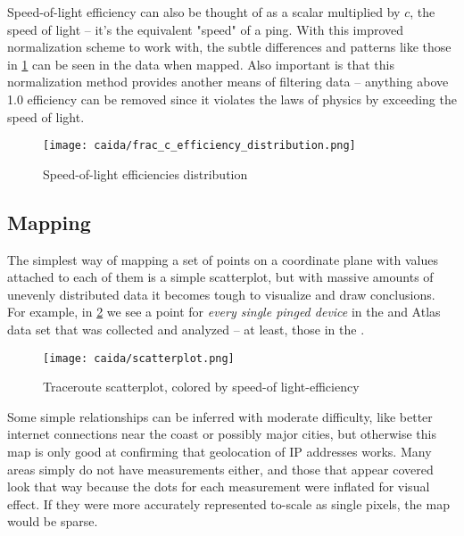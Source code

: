 Speed-of-light efficiency can also be thought of as a scalar multiplied by $c$, the speed of light -- it's the equivalent "speed" of a ping. With this improved normalization scheme to work with, the subtle differences and patterns like those in \cref{fig:speed_of_light_efficiency_distribution} can be seen in the data when mapped. Also important is that this normalization method provides another means of filtering data -- anything above 1.0 efficiency can be removed since it violates the laws of physics by exceeding the speed of light.

\begin{figure}[ht]
    \centering
    \texttt{[image: caida/frac\_c\_efficiency\_distribution.png]}
    \caption{Speed-of-light efficiencies distribution}
    \label{fig:speed_of_light_efficiency_distribution}
\end{figure}

\subsection{Mapping}

The simplest way of mapping a set of points on a coordinate plane with values attached to each of them is a simple scatterplot, but with massive amounts of unevenly distributed data it becomes tough to visualize and draw conclusions. For example, in \cref{fig:caida_scatterplot} we see a point for \textit{every single pinged device} in the \caida and \ripe Atlas data set that was collected and analyzed -- at least, those in the \us.

\begin{figure}[htb]
    \centering
    \texttt{[image: caida/scatterplot.png]}
    \caption{Traceroute scatterplot, colored by speed-of light-efficiency}
    \label{fig:caida_scatterplot}
\end{figure}

Some simple relationships can be inferred with moderate difficulty, like better internet connections near the coast or possibly major cities, but otherwise this map is only good at confirming that geolocation of IP addresses works. Many areas simply do not have measurements either, and those that appear covered look that way because the dots for each measurement were inflated for visual effect. If they were more accurately represented to-scale as single pixels, the map would be sparse.

